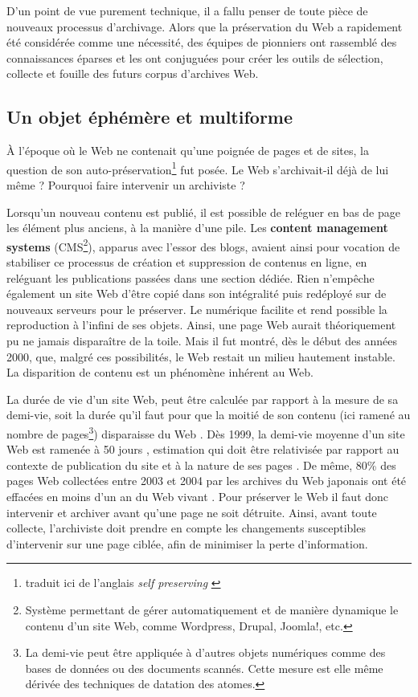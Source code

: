 \documentclass[symmetric,justified,marginals=raggedouter]{tufte-book}
\begin{document}
\noindent D'un point de vue purement technique, il a fallu penser de toute pièce de nouveaux processus d'archivage. Alors que la préservation du Web a rapidement été considérée comme une nécessité, des équipes de pionniers ont rassemblé des connaissances éparses et les ont conjuguées pour créer les outils de sélection, collecte et fouille des futurs corpus d'archives Web. 

\subsection{Un objet éphémère et multiforme}  
 
\noindent À l'époque où le Web ne contenait qu'une poignée de pages et de sites, la question de son auto-préservation\footnote{\RaggedOuter traduit ici de l'anglais \textit{self preserving} \citep{spinellis_decay_2003}} fut posée. Le Web s'archivait-il déjà de lui même ? Pourquoi faire intervenir un archiviste ?

Lorsqu'un nouveau contenu est publié, il est possible de reléguer en bas de page les élément plus anciens, à la manière d'une pile. Les \textbf{content management systems} (CMS\footnote{\RaggedOuter Système permettant de gérer automatiquement et de manière dynamique le contenu d'un site Web, comme Wordpress, Drupal, Joomla!, etc.}), apparus avec l'essor des blogs, avaient ainsi pour vocation de stabiliser ce processus de création et suppression de contenus en ligne, en reléguant les publications passées dans une section dédiée. Rien n'empêche également un site Web d'être copié dans son intégralité puis redéployé sur de nouveaux serveurs pour le préserver. Le numérique facilite et rend possible la reproduction à l'infini de ses objets. Ainsi, une page Web aurait théoriquement pu ne jamais disparaître de la toile. Mais il fut montré, dès le début des années 2000, que, malgré ces possibilités, le Web restait un milieu hautement instable. La disparition de contenu est un phénomène inhérent au Web. 

La durée de vie d'un site Web, peut être calculée par rapport à la mesure de sa demi-vie, soit la durée qu'il faut pour que la moitié de son contenu (ici ramené au nombre de pages\footnote{\RaggedOuter La demi-vie peut être appliquée à d'autres objets numériques comme des bases de données ou des documents scannés. Cette mesure est elle même dérivée des techniques de datation des atomes.}) disparaisse du Web \citep{koehler_longitudinal_2004}. Dès 1999, la demi-vie moyenne d'un site Web est ramenée à 50 jours \citep{cho_evolution_1999}, estimation qui doit être relativisée par rapport au contexte de publication du site et à la nature de ses pages \citep{mcdonnell_cataloging_1999,fetterly_large-scale_2003}. De même, 80\% des pages Web collectées entre 2003 et 2004 par les archives du Web japonais ont été effacées en moins d'un an du Web vivant \citep{toyoda_whats_2006}. Pour préserver le Web il faut donc intervenir et archiver avant qu'une page ne soit détruite. Ainsi, avant toute collecte, l'archiviste doit prendre en compte les changements susceptibles d'intervenir sur une page ciblée, afin de minimiser la perte d'information.
\end{document}
